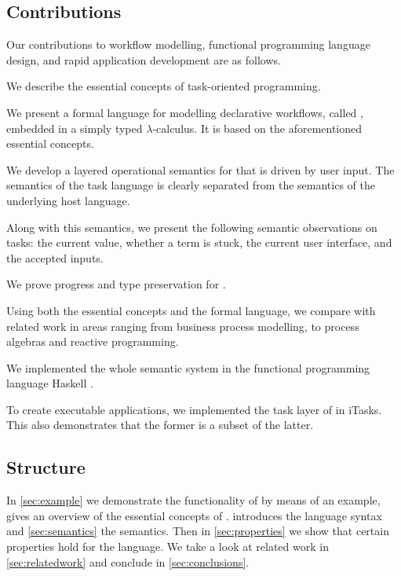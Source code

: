 \subsection{Contributions}

Our contributions to workflow modelling, functional programming language design, and rapid application development are as follows.


\begin{enumerate*}
  \item
    We describe the essential concepts of task-oriented programming.
  \item
    We present a formal language for modelling declarative workflows, called \TOPHAT, embedded in a simply typed $\lambda$-calculus.
    It is based on the aforementioned essential \TOP concepts.
  \item
    We develop a layered operational semantics for \TOPHAT that is driven by user input.
    The semantics of the task language is clearly separated from the semantics of the underlying host language.
  \item
    Along with this semantics, we present the following semantic observations on tasks:
    the current value, whether a term is stuck, the current user interface, and the accepted inputs.
  \item
    We prove progress and type preservation for \TOPHAT.
  \item
    Using both the essential concepts and the formal language, we compare \TOP with related work in areas ranging from business process modelling, to process algebras and reactive programming.
  \item
    We implemented the whole semantic system in the functional programming language Haskell \cite{marlow2010haskell}.
  \item
    To create executable applications, we implemented the task layer of \TOPHAT in iTasks.
    This also demonstrates that the former is a subset of the latter.
\end{enumerate*}


\subsection{Structure}

In \cref{sec:example} we demonstrate the functionality of \TOPHAT by means of an example,
 gives an overview of the essential concepts of \TOP.
 introduces the \TOPHAT language syntax
and \cref{sec:semantics} the semantics.
Then in \cref{sec:properties} we show that certain properties hold for the language.
We take a look at related work in \cref{sec:relatedwork}
and conclude in \cref{sec:conclusions}.
